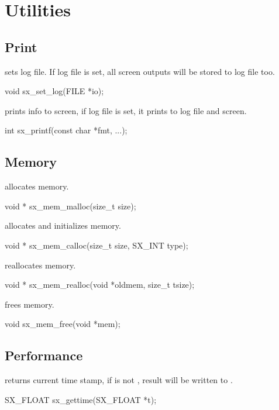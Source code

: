 \chapter{Utilities}

\section{Print}

 sets log file. If log file is set, all screen outputs will be stored to log file too.
\begin{evb}
void sx_set_log(FILE *io);
\end{evb}

 prints info to screen, if log file is set, it prints to log file and screen.
\begin{evb}
int sx_printf(const char *fmt, ...);
\end{evb}

\section{Memory}

 allocates memory.
\begin{evb}
void * sx_mem_malloc(size_t size);
\end{evb}

 allocates and initializes memory.
\begin{evb}
void * sx_mem_calloc(size_t size, SX_INT type);
\end{evb}

 reallocates memory.
\begin{evb}
void * sx_mem_realloc(void *oldmem, size_t tsize);
\end{evb}

 frees memory.
\begin{evb}
void sx_mem_free(void *mem);
\end{evb}

\section{Performance}

 returns current time stamp, if  is not , 
result will be written to .
\begin{evb}
SX_FLOAT sx_gettime(SX_FLOAT *t);
\end{evb}
